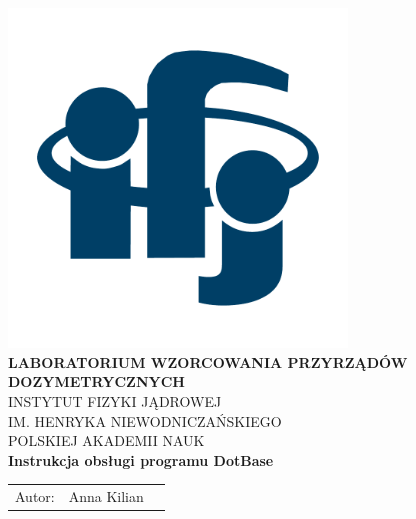 
\begin{center}
\includegraphics[width=9cm]{obrazki/logo_ifj_kolor2.pdf}\\[9mm]
{\Large \textbf{LABORATORIUM WZORCOWANIA PRZYRZĄDÓW DOZYMETRYCZNYCH}}\\[5mm]
INSTYTUT FIZYKI JĄDROWEJ\\
IM. HENRYKA NIEWODNICZAŃSKIEGO\\
POLSKIEJ AKADEMII NAUK\\[8mm]
{\Large \textbf{Instrukcja obsługi programu DotBase}}\\[8mm]
\end{center}

\begin{tabular}{lll}
	Autor: & Anna Kilian 
\end{tabular}

\czystastopka
{}

\pagebreak


\czystastopka

\pagebreak